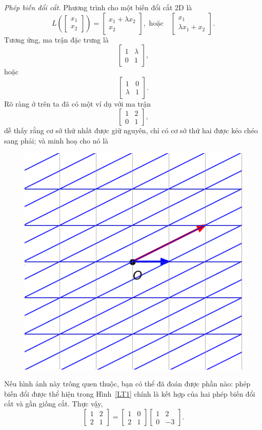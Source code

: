 \emph{Phép biến đổi cắt.}\newline
Phương trình cho một biến đổi cắt 2D là 
\[
L\left(\begin{bmatrix}
    x_1 \\x_2
 \end{bmatrix}\right)=\begin{bmatrix}
    x_1 +\lambda x_2 \\x_2
 \end{bmatrix}, \text{ hoặc}\quad 
 \begin{bmatrix}
    x_1 \\\lambda x_1 +x_2
 \end{bmatrix}.
\] Tương ứng, ma trận đặc trưng là 
\[\begin{bmatrix}
    1&\lambda\\0&1
\end{bmatrix},\] hoặc 
\[\begin{bmatrix}
    1&0\\\lambda&1
\end{bmatrix}.\]
Rõ ràng ở trên ta đã có một ví dụ với ma trận 
\[
\begin{bmatrix}
    1&2\\0&1
 \end{bmatrix},
\]
 dễ thấy rằng cơ sở thứ nhất được giữ nguyên, chỉ có cơ sở thứ hai được kéo chéo sang phải; và minh hoạ cho nó là 
 \begin{figure}[H]
    \centering
    \includegraphics[width=0.4\linewidth]{Tuan2/Figures/LT3}
 \end{figure}
Nếu hình ảnh này trông quen thuộc, bạn có thể đã đoán được phần nào: phép biến đổi được thể hiện trong Hình~\ref{LT1} chính là kết hợp của hai phép biến đổi cắt và gần giống cắt.
Thực vậy,
\[
\begin{bmatrix}
    1&2\\2&1
 \end{bmatrix}=
 \begin{bmatrix}
    1&0\\2&1
 \end{bmatrix}
 \begin{bmatrix}
    1&2\\0&-3
 \end{bmatrix}.
\]
